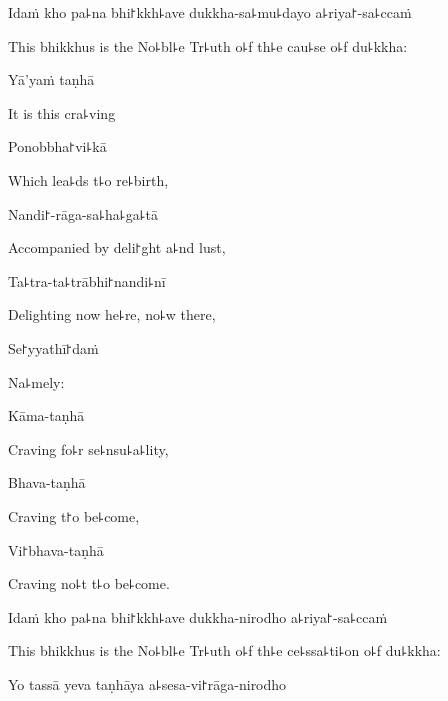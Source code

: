 Idaṁ kho pa꜕na bhi꜓kkh꜕ave dukkha-sa꜕mu꜕dayo a꜕riya꜓-sa꜕ccaṁ

\begin{english}
  This bhikkhus is the No꜕bl꜕e Tr꜕uth o꜕f th꜕e cau꜕se o꜕f du꜕kkha:
\end{english}

Yā'yaṁ taṇhā

\begin{english}
  It is this cra꜕ving
\end{english}

Ponobbha꜓vi꜕kā

\begin{english}
  Which lea꜕ds t꜕o re꜕birth,
\end{english}

Nandi꜓-rāga-sa꜕ha꜕ga꜕tā

\begin{english}
  Accompanied by deli꜓ght a꜕nd lust,
\end{english}

Ta꜕tra-ta꜕trābhi꜓nandi꜕nī

\begin{english}
  Delighting now he꜕re, no꜕w there,
\end{english}

Se꜓yyathī꜓daṁ

\begin{english}
  Na꜕mely:
\end{english}

\ifaivedition
\clearpage
\fi

Kāma-taṇhā

\begin{english}
  Craving fo꜕r se꜕nsu꜕a꜕lity,
\end{english}

Bhava-taṇhā

\begin{english}
  Craving t꜓o be꜕come,
\end{english}

Vi꜓bhava-taṇhā

\begin{english}
  Craving no꜕t t꜕o be꜕come.
\end{english}

Idaṁ kho pa꜕na bhi꜓kkh꜕ave dukkha-nirodho a꜕riya꜓-sa꜕ccaṁ

\begin{english}
  This bhikkhus is the No꜕bl꜕e Tr꜕uth o꜕f th꜕e ce꜕ssa꜕ti꜕on o꜕f du꜕kkha:
\end{english}

Yo tassā yeva taṇhāya a꜕sesa-vi꜓rāga-nirodho

